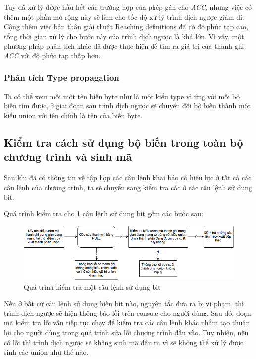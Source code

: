 Tuy đã xử lý được hầu hết các trường hợp của phép gán cho \textit{ACC}, nhưng việc có thêm một phần mở rộng này sẽ làm cho tốc độ xử lý trình dịch ngược giảm đi. Cộng thêm việc bản thân giải thuật Reaching definitions đã có độ phức tạp cao, tổng thời gian xử lý cho bước này của trình dịch ngược là khá lớn. Vì vậy, một phương pháp phân tích khác đã được thực hiện để tìm ra giá trị của thanh ghi \textit{ACC} với độ phức tạp thấp hơn.

\subsubsection{Phân tích Type propagation}
Ta có thể xem mỗi một tên biến byte như là một kiểu type vì ứng với mỗi bộ biến tìm được, ở giai đoạn sau trình dịch ngược sẽ chuyển đổi bộ biến thành một kiểu union với tên chính là tên của biến byte.
\subsection{Kiểm tra cách sử dụng bộ biến trong toàn bộ chương trình và sinh mã}

\label{sec:laststep}
Sau khi đã có thông tin về tập hợp các câu lệnh khai báo có hiệu lực ở tất cả các câu lệnh của chương trình, ta sẽ chuyển sang kiểm tra các ở các câu lệnh sử dụng bit.

Quá trình kiểm tra cho 1 câu lệnh sử dụng bit gồm các bước sau:

\begin{figure}
	\centering
	\includegraphics[width=0.7\linewidth]{image/checkUnionSteps}
	\caption{Quá trình kiểm tra một câu lệnh sử dụng bit}
	\label{fig:checkunionsteps}
\end{figure}

Nếu ở bất cứ câu lệnh sử dụng biến bit nào, nguyên tắc đưa ra bị vi phạm, thì trình dịch ngược sẽ hiện thông báo lỗi trên console cho người dùng. Sau đó, đoạn mã kiểm tra lỗi vẫn tiếp tục chạy để kiểm tra các câu lệnh khác nhằm tạo thuận lợi cho người dùng trong quá trình sửa lỗi chương trình đầu vào. Tuy nhiên, nếu có lỗi thì trình dịch ngược sẽ không sinh mã đầu ra vì sẽ không thể xử lý được sinh các union như thế nào.


